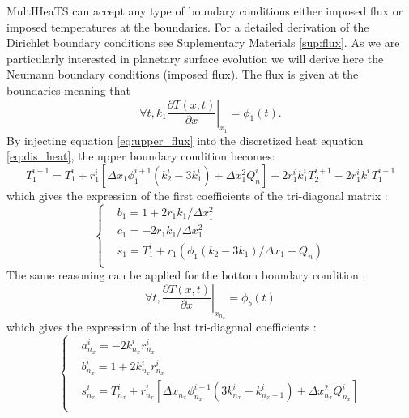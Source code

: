 \documentclass[]{interact}
\theoremstyle{plain}%
\theoremstyle{definition}
\theoremstyle{remark}
\begin{document}
MultIHeaTS can accept any type of boundary conditions either imposed flux or imposed temperatures at the boundaries.
For a detailed derivation of the Dirichlet boundary conditions see Suplementary Materials \ref{sup:flux}.
As we are particularly interested in planetary surface evolution we will derive here the Neumann boundary conditions (imposed flux).
The flux is given at the boundaries meaning that
\begin{equation}
    \forall t, k_1 \left. \dfrac{\partial T(x, t)}{\partial x}\right|_{x_1} = \phi_1(t).
    \label{eq:upper_flux}
\end{equation}
By injecting equation \ref{eq:upper_flux} into the discretized heat equation \ref{eq:dis_heat}, the upper boundary condition becomes:
\begin{equation}
    T_1^{i+1} = T_1^i + r_1^i \left[ \Delta x_{1} \phi_1^{i+1} \left(k_{2}^i - 3k_{1}^i\right) + \Delta x^2_1 Q_n^i \right]
      +  2 r_1^i k_1^i T_{2}^{i+1} - 2 r_1^i k_1^i  T_{1}^{i+1}
\end{equation}
which gives the expression of the first coefficients of the tri-diagonal matrix :
\begin{equation}
    \begin{cases}
        &b_1 = 1 + 2 r_1 k_1 / \Delta x_1^2  \\
        &c_1 = - 2 r_1 k_1   / \Delta x_1^2 \\
        &s_1 =  T_1^i + r_1 \left( \phi_1 \left(k_{2} - 3k_{1} \right)/\Delta x_1 +  Q_n \right) \\
    \end{cases}   
\end{equation}
The same reasoning can be applied for the bottom boundary condition :
\begin{equation}
    \forall t, \left. \dfrac{\partial T(x, t)}{\partial x}\right|_{x_{n_x}} = \phi_b(t) 
\end{equation}
which gives the expression of the last tri-diagonal coefficients :
\begin{equation}
    \begin{cases}
        &a_{n_x}^i = - 2k_{n_x}^i r_{n_x}^i  \\
        &b_{n_x}^i = 1 +  2k_{n_x}^i r_{n_x}^i  \\
        &s_{n_x}^i =T_{n_x}^i + r_{n_x}^i \left[  \Delta x_{n_x} \phi_{n_x}^{i+1} \left( 3 k_{n_x}^i - k_{n_x-1}^i\right)  +  \Delta x^2_{n_x} Q_{n_x}^i\right] \\
        
    \end{cases}   
\end{equation}
\end{document}
